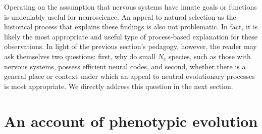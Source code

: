 \documentclass[twocolumn]{article}
\begin{document}

Operating on the assumption that nervous systems have innate goals or functions is undeniably useful for neuroscience. An appeal to natural selection as the historical process that explains these findings is also not problematic. In fact, it is likely the most appropriate and useful type of process-based explanation for these observations. In light of the previous section's pedagogy, however, the reader may ask themselves two questions: first, why do small $N_e$ species, such as those with nervous systems, possess efficient neural codes, and second, whether there is a general place or context under which an appeal to neutral evolutionary processes is most appropriate. We directly address this question in the next section.

\section{An account of phenotypic evolution}
\end{document}
